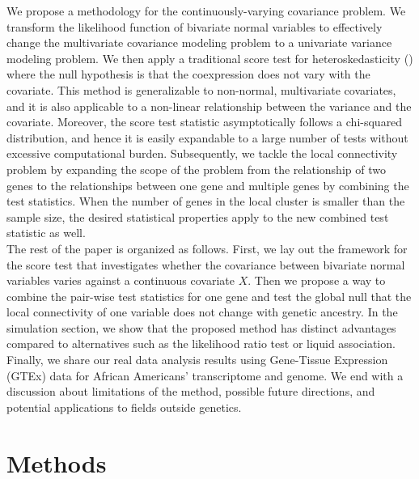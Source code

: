 \documentclass[aap,authoryear, preprint]{imsart}
\numberwithin{equation}{section}
\theoremstyle{plain}
\begin{document}
We propose a methodology for the continuously-varying covariance problem. We transform the likelihood function of bivariate normal variables to effectively change the multivariate covariance modeling problem to a univariate variance modeling problem. We then apply a traditional score test for heteroskedasticity (\cite{breusch1979simple}) where the null hypothesis is that the coexpression does not vary with the covariate. This method is generalizable to non-normal, multivariate covariates, and it is also applicable to a non-linear relationship between the variance and the covariate. Moreover, the score test statistic asymptotically follows a chi-squared distribution, and hence it is easily expandable to a large number of tests without excessive computational burden. Subsequently, we tackle the local connectivity problem by expanding the scope of the problem from the relationship of two genes to the relationships between one gene and multiple genes by combining the test statistics. When the number of genes in the local cluster is smaller than the sample size, the desired statistical properties apply to the new combined test statistic as well. \\

The rest of the paper is organized as follows. First, we lay out the framework for the score test that investigates whether the covariance between bivariate normal variables varies against a continuous covariate $X$. Then we propose a way to combine the pair-wise test statistics for one gene and test the global null that the local connectivity of one variable does not change with genetic ancestry. In the simulation section, we show that the proposed method has distinct advantages compared to alternatives such as the likelihood ratio test or liquid association. Finally, we share our real data analysis results using Gene-Tissue Expression (GTEx) data for African Americans' transcriptome and genome. We end with a discussion about limitations of the method, possible future directions, and potential applications to fields outside genetics.

\section{Methods}
\end{document}
